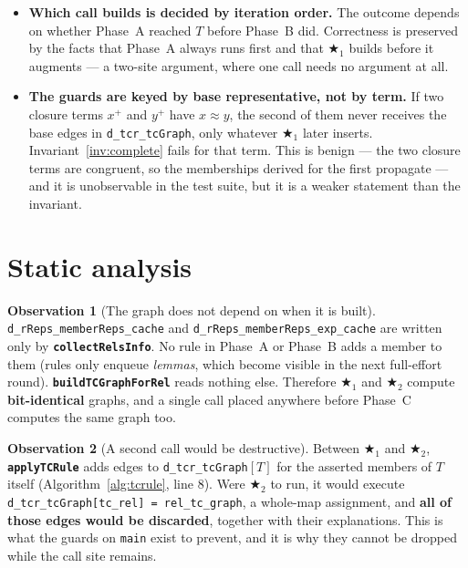 \documentclass[11pt,a4paper]{article}
\newcommand{\code}[1]{\texttt{\small #1}}
\newcommand{\fn}[1]{\texttt{\small\bfseries #1}}
\newcommand{\tc}[1]{{#1}^{+}}
\theoremstyle{definition}
\newtheorem{observation}{Observation}
\begin{document}
\begin{itemize}[leftmargin=*,itemsep=2pt]
\item \textbf{Which call builds is decided by iteration order.} The outcome
  depends on whether Phase~A reached $T$ before Phase~B did. Correctness is
  preserved by the facts that Phase~A always runs first and that $\bigstar_1$
  builds before it augments --- a two-site argument, where one call needs no
  argument at all.
\item \textbf{The guards are keyed by base representative, not by term.} If two
  closure terms $\tc{x}$ and $\tc{y}$ have $x \approx y$, the second of them
  never receives the base edges in \code{d\_tcr\_tcGraph}, only whatever
  $\bigstar_1$ later inserts. Invariant~\ref{inv:complete} fails for that term.
  This is benign --- the two closure terms are congruent, so the memberships
  derived for the first propagate --- and it is unobservable in the test suite,
  but it is a weaker statement than the invariant.
\end{itemize}

\section{Static analysis}

\begin{observation}[The graph does not depend on when it is built]
\code{d\_rReps\_memberReps\_cache} and
\code{d\_rReps\_\allowbreak{}memberReps\_\allowbreak{}exp\_cache} are written only by
\fn{collectRelsInfo}. No rule in Phase~A or Phase~B adds a member to them
(rules only enqueue \emph{lemmas}, which become visible in the next
full-effort round). \fn{buildTCGraphForRel} reads nothing else. Therefore
$\bigstar_1$ and $\bigstar_2$ compute \textbf{bit-identical} graphs, and a
single call placed anywhere before Phase~C computes the same graph too.
\end{observation}

\begin{observation}[A second call would be destructive]\label{obs:destroy}
Between $\bigstar_1$ and $\bigstar_2$, \fn{applyTCRule} adds edges to
\code{d\_tcr\_tcGraph}$[T]$ for the asserted members of $T$ itself
(Algorithm~\ref{alg:tcrule}, line 8). Were $\bigstar_2$ to run, it would execute
\code{d\_tcr\_tcGraph[tc\_rel] = rel\_tc\_graph}, a whole-map assignment, and
\textbf{all of those edges would be discarded}, together with their
explanations. This is what the guards on \code{main} exist to prevent, and it is
why they cannot be dropped while the call site remains.
\end{observation}
\end{document}
